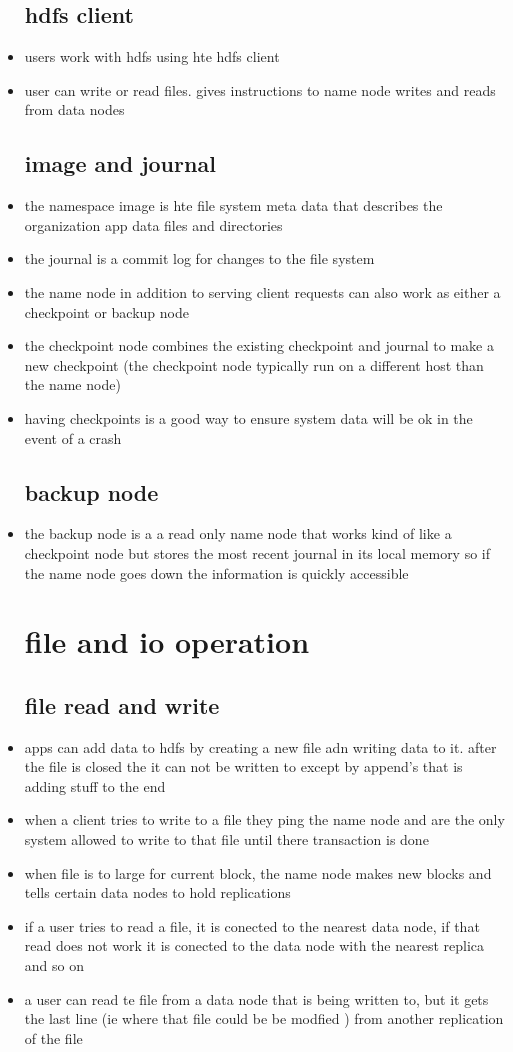\documentclass{article}
\begin{document}
\begin{itemize}
\subsection*{hdfs client}
\item users work with hdfs using hte hdfs client 
\item user can write or read files. gives instructions to name node writes and reads from data nodes
\subsection*{image and journal}
\item the namespace image is hte file system meta data that describes the organization app data files and directories
\item the journal is a commit log for changes to the file system 
\item the name node in addition to serving client requests can also work as either a checkpoint or backup node 
\item the checkpoint node combines the existing checkpoint and journal to make a new checkpoint (the checkpoint node typically run on a different host than the name node)
\item having checkpoints is a good way to ensure system data will be ok in the event of a crash 
\subsection*{backup node}
\item the backup node is a a read only name node that works kind of like a checkpoint node but stores the most recent journal in its local memory so if the name node goes down the information is quickly accessible
\section*{file and io operation}
\subsection*{file read and write}
\item apps can add data to hdfs by creating a new file adn writing data to it. after the file is closed the it can not be written to except by append's that is adding stuff to the end 
\item when a client tries to write to a file they ping the name node and are the only system allowed to write to that file until there transaction is done 
\item when file is to large for current block, the name node makes new blocks and tells certain data nodes to hold replications 
\item if a user tries to read a file, it is conected to the nearest data node, if that read does not work it is conected to the data node with the nearest replica and so on 
\item a user can read te file from a data node that is being written to, but it gets the last line (ie where that file could be be modfied ) from another replication of the file 

\end{itemize}
\end{document}
